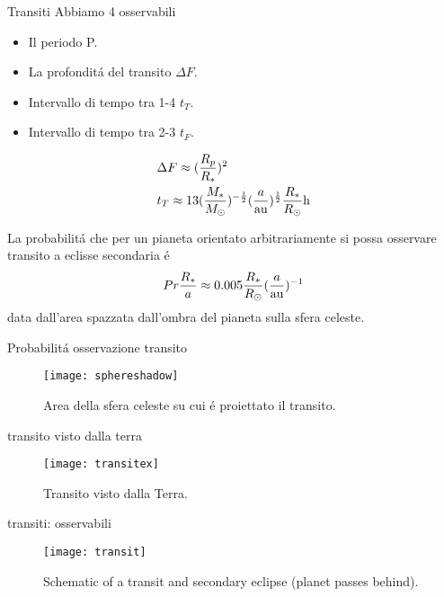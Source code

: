\begin{frame}{Transiti}
Abbiamo 4 osservabili
\begin{itemize}
    \item Il periodo P.
    \item La profondit\'a del transito $\Delta F$.
    \item Intervallo di tempo tra 1-4 $t_T$.
    \item Intervallo di tempo tra 2-3 $t_F$.
\end{itemize}
\begin{align*}
&\Delta F\approx(\frac{R_p}{R_*})^2\\
&t_T\approx13(\frac{M_*}{\msun{}})\expy{-\frac{1}{2}}(\frac{a}{\si{\astronomicalunit}})\expy{\frac{1}{2}}\frac{R_*}{\rsun{}}\si{\hour}
\end{align*}

La probabilit\'a che per un pianeta orientato arbitrariamente si possa osservare transito a eclisse secondaria \'e
\begin{equation*}
Pr\frac{R_*}{a}\approx0.005\frac{R_*}{\rsun{}}(\frac{a}{\si{\astronomicalunit}})\expy{-1}
\end{equation*}
data dall'area spazzata dall'ombra del pianeta sulla sfera celeste.
\end{frame}

\begin{wordonframe}{Probabilit\'a osservazione transito}
\begin{figure}[!ht]
\centering
\texttt{[image: sphereshadow]}
\caption{Area della sfera celeste su cui \'e proiettato il transito.}
\end{figure}
\end{wordonframe}

\begin{wordonframe}{transito visto dalla terra}
\begin{figure}[!ht]
\centering
\texttt{[image: transitex]}
\caption{Transito visto dalla Terra.}
\end{figure}
\end{wordonframe}

\begin{wordonframe}{transiti: osservabili}
\begin{figure}[!ht]
\centering
\texttt{[image: transit]}
\caption{Schematic of a transit and secondary eclipse (planet passes behind).}
\end{figure}
\end{wordonframe}

